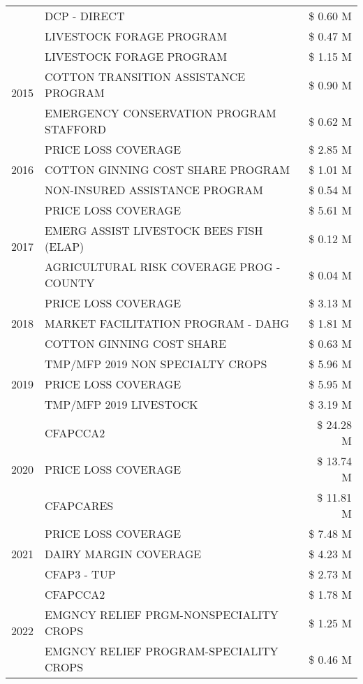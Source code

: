 \begin{tabular}{llr}
 & DCP - DIRECT & \$ 0.60 M \\
 & LIVESTOCK FORAGE PROGRAM & \$ 0.47 M \\
\cline{1-3}
\multirow[t]{3}{*}{2015} & LIVESTOCK FORAGE PROGRAM & \$ 1.15 M \\
 & COTTON TRANSITION ASSISTANCE PROGRAM & \$ 0.90 M \\
 & EMERGENCY CONSERVATION PROGRAM STAFFORD & \$ 0.62 M \\
\cline{1-3}
\multirow[t]{3}{*}{2016} & PRICE LOSS COVERAGE & \$ 2.85 M \\
 & COTTON GINNING COST SHARE PROGRAM & \$ 1.01 M \\
 & NON-INSURED ASSISTANCE PROGRAM & \$ 0.54 M \\
\cline{1-3}
\multirow[t]{3}{*}{2017} & PRICE LOSS COVERAGE & \$ 5.61 M \\
 & EMERG ASSIST LIVESTOCK BEES FISH (ELAP) & \$ 0.12 M \\
 & AGRICULTURAL RISK COVERAGE PROG - COUNTY & \$ 0.04 M \\
\cline{1-3}
\multirow[t]{3}{*}{2018} & PRICE LOSS COVERAGE & \$ 3.13 M \\
 & MARKET FACILITATION PROGRAM - DAHG & \$ 1.81 M \\
 & COTTON GINNING COST SHARE & \$ 0.63 M \\
\cline{1-3}
\multirow[t]{3}{*}{2019} & TMP/MFP 2019 NON SPECIALTY CROPS & \$ 5.96 M \\
 & PRICE LOSS COVERAGE & \$ 5.95 M \\
 & TMP/MFP 2019 LIVESTOCK & \$ 3.19 M \\
\cline{1-3}
\multirow[t]{3}{*}{2020} & CFAPCCA2 & \$ 24.28 M \\
 & PRICE LOSS COVERAGE & \$ 13.74 M \\
 & CFAPCARES & \$ 11.81 M \\
\cline{1-3}
\multirow[t]{3}{*}{2021} & PRICE LOSS COVERAGE & \$ 7.48 M \\
 & DAIRY MARGIN COVERAGE & \$ 4.23 M \\
 & CFAP3 - TUP & \$ 2.73 M \\
\cline{1-3}
\multirow[t]{3}{*}{2022} & CFAPCCA2 & \$ 1.78 M \\
 & EMGNCY RELIEF PRGM-NONSPECIALITY CROPS & \$ 1.25 M \\
 & EMGNCY RELIEF PROGRAM-SPECIALITY CROPS & \$ 0.46 M \\
\cline{1-3}
\bottomrule
\end{tabular}
